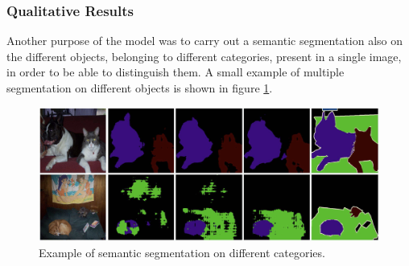 \subsubsection{Qualitative Results}
Another purpose of the model was to carry out a semantic segmentation also 
on the different objects, belonging to different categories, present in a single 
image, in order to be able to distinguish them. A small example of multiple 
segmentation on different objects is shown in figure \ref{fig:segmentationCategories}.
\begin{figure}[h!]
    \centering
    \includegraphics[width = 1 \linewidth]{images/paper6/multiple segmentation.png}
    \centering
    \caption{Example of semantic segmentation on different categories.}
    \label{fig:segmentationCategories}
\end{figure}

